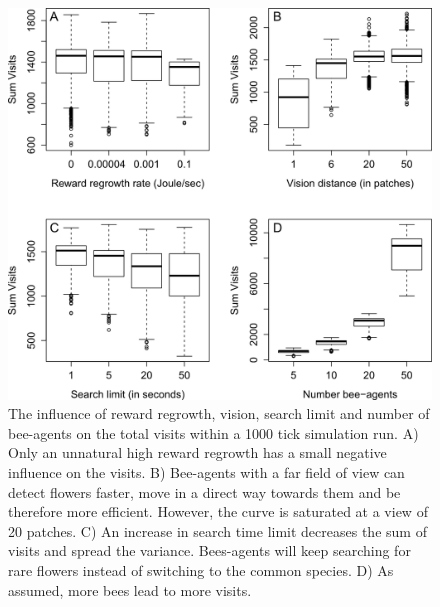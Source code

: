 \clearpage

\begin{figure} [h!]
	\centering
	\includegraphics[width=14cm]{Images/SA_SUM}
	\caption{The influence of reward regrowth, vision, search limit and number of bee-agents on the total visits within a 1000 tick simulation run. A) Only an unnatural high reward regrowth has a small negative influence on the visits. B) Bee-agents with a far field of view can detect flowers faster, move in a direct way towards them and be therefore more efficient. However, the curve is saturated at a view of 20 patches. C) An increase in search time limit decreases the sum of visits and spread the variance. Bees-agents will keep searching for rare flowers instead of switching to the common species. D) As assumed, more bees lead to more visits.} 
	\label{fig:SA_SUM}
\end{figure}

\clearpage

